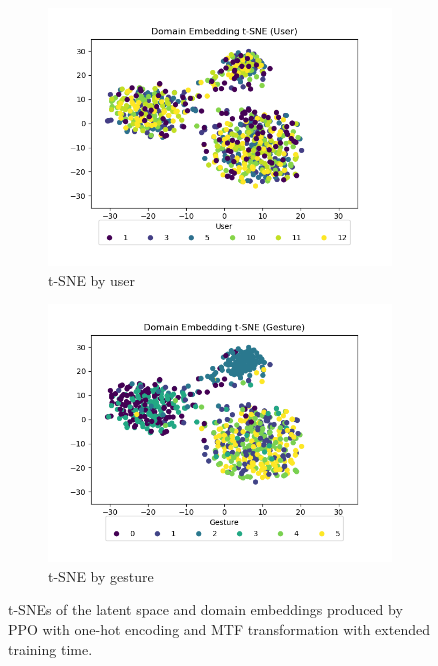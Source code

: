 \begin{figure}
\begin{subfigure}{0.3\textwidth}
		\includegraphics[width=\textwidth]{figures/extended/long_de_user}
		\caption{t-SNE by user}
		\label{fig:extended-de-user}
	\end{subfigure}
	\hfill
	\begin{subfigure}{0.3\textwidth}
		\centering
		\includegraphics[width=\textwidth]{figures/extended/long_de_gesture}
		\caption{t-SNE by gesture}
		\label{fig:extended-de-gesture}
	\end{subfigure}
	\hfill
	\caption{t-SNEs of the latent space and domain embeddings produced by PPO with one-hot encoding and MTF transformation with extended training time.}
	\label{fig:extended-tsnes}
\end{figure}

